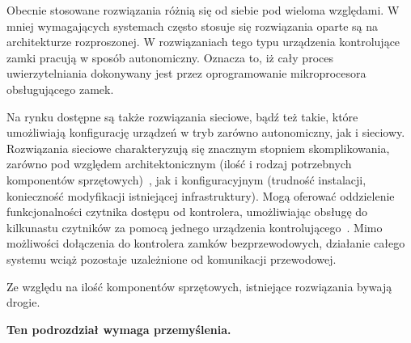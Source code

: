 		Obecnie stosowane rozwiązania różnią się od siebie pod wieloma względami. W mniej wymagających systemach często stosuje się rozwiązania oparte są na architekturze rozproszonej. W rozwiązaniach tego typu urządzenia kontrolujące zamki pracują w sposób autonomiczny. Oznacza to, iż cały proces uwierzytelniania dokonywany jest przez oprogramowanie mikroprocesora obsługującego zamek.

		Na rynku dostępne są także rozwiązania sieciowe, bądź też takie, które umożliwiają konfigurację urządzeń w tryb zarówno autonomiczny, jak i sieciowy. Rozwiązania sieciowe charakteryzują się znacznym stopniem skomplikowania, zarówno pod względem architektonicznym (ilość i rodzaj potrzebnych komponentów sprzętowych)~\cite{racs5}, jak i konfiguracyjnym (trudność instalacji, konieczność modyfikacji istniejącej infrastruktury). Mogą oferować oddzielenie funkcjonalności czytnika dostępu od kontrolera, umożliwiając obsługę do kilkunastu czytników za pomocą jednego urządzenia kontrolującego~\cite{racs5}. Mimo możliwości dołączenia do kontrolera zamków bezprzewodowych, działanie całego systemu wciąż pozostaje uzależnione od komunikacji przewodowej.

		Ze względu na ilość komponentów sprzętowych, istniejące rozwiązania bywają drogie.

		\textbf{Ten podrozdział wymaga przemyślenia.}